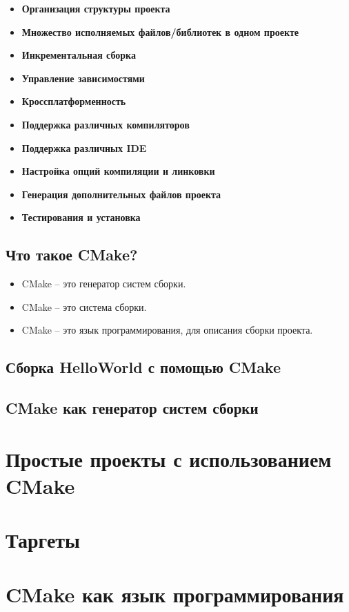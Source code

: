 \documentclass{article}
\begin{document}
\begin{itemize}
\item \textbf{Организация структуры проекта}

\item \textbf{Множество исполняемых файлов/библиотек в одном проекте}

\item \textbf{Инкрементальная сборка}

\item \textbf{Управление зависимостями}

\item \textbf{Кроссплатформенность}

\item \textbf{Поддержка различных компиляторов}

\item \textbf{Поддержка различных IDE}


\item \textbf{Настройка опций компиляции и линковки}

\item \textbf{Генерация дополнительных файлов проекта}

\item \textbf{Тестирования и установка}
\end{itemize}


\subsection*{Что такое CMake?}
\begin{itemize}
\item CMake -- это генератор систем сборки.
\item CMake -- это система сборки.
\item CMake -- это язык программирования, для описания сборки проекта.
\end{itemize}


\subsection*{Сборка HelloWorld с помощью CMake}

\subsection*{CMake как генератор систем сборки}


\newpage
\section{Простые проекты с использованием CMake}

\section{Таргеты}


\section{CMake как язык программирования}
\end{document}
